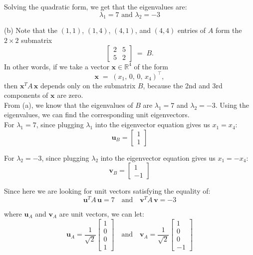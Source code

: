 \documentclass{article}
\begin{document}
Solving the quadratic form, we get that the eigenvalues are:
\[\lambda_1 = 7 \text{ and } \lambda_2 = -3\]

(b) Note that the \((1,1)\), \((1,4)\), \((4,1)\), and \((4,4)\) entries of \(A\) form the \(2\times 2\) submatrix
\[
\begin{bmatrix}
2 & 5 \\[6pt]
5 & 2
\end{bmatrix}
\;=\;
B.
\]
In other words, if we take a vector \(\mathbf{x}\in\mathbb{R}^4\) of the form
\[
\mathbf{x} \;=\; (x_1,\,0,\,0,\,x_4)^\top,
\]
then
\(\mathbf{x}^T A \,\mathbf{x}\) depends only on the submatrix \(B\), because the 2nd and 3rd components of \(\mathbf{x}\) are zero. \\

From (a), we know that the eigenvalues of \(B\) are \(\lambda_1 = 7\) and \(\lambda_2 = -3\). Using the eigenvalues, we can find the corresponding unit eigenvectors. \\

For \(\lambda_1 = 7\), since plugging $\lambda_1$ into the eigenvector equation gives us $x_1 = x_4$:
\[
\mathbf{u}_B = \begin{bmatrix} 1 \\ 1 \end{bmatrix}
\]

For \(\lambda_2 = -3\), since plugging $\lambda_2$ into the eigenvector equation gives us $x_1 = -x_4$:
\[
\mathbf{v}_B = \begin{bmatrix} 1 \\ -1 \end{bmatrix}
\]

Since here we are looking for unit vectors satisfying the equality of:
\[
\mathbf{u}^T A \,\mathbf{u} = 7 \quad \text{and} \quad \mathbf{v}^T A \,\mathbf{v} = -3
\]

where \(\mathbf{u}_A\) and \(\mathbf{v}_A\) are unit vectors, we can let:
\[
\mathbf{u}_A = \frac{1}{\sqrt{2}}\begin{bmatrix} 1 \\ 0 \\ 0 \\ 1 \end{bmatrix} \quad \text{and} \quad \mathbf{v}_A = \frac{1}{\sqrt{2}}\begin{bmatrix} 1 \\ 0 \\ 0 \\ -1 \end{bmatrix}
\]
\end{document}
